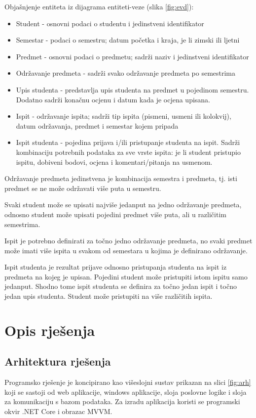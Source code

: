 \documentclass[times, utf8, diplomski]{fer}
\begin{document}
Objašnjenje entiteta iz dijagrama entiteti-veze (slika \ref{fig:evd}):
\begin{itemize}
    \item Student - osnovni podaci o studentu i jedinstveni identifikator
    \item Semestar - podaci o semestru; datum početka i kraja, je li zimski ili ljetni 
    \item Predmet - osnovni podaci o predmetu; sadrži naziv i jedinstveni identifikator
    \item Održavanje predmeta - sadrži svako održavanje predmeta po semestrima
    \item Upis studenta - predstavlja upis studenta na predmet u pojedinom semestru. Dodatno sadrži konačnu ocjenu i datum kada je ocjena upisana.
    \item Ispit - održavanje ispita; sadrži tip ispita (pismeni, usmeni ili kolokvij), datum održavanja, predmet i semestar kojem pripada
    \item Ispit studenta - pojedina prijava i/ili pristupanje studenta na ispit. Sadrži kombinaciju potrebnih podataka za sve vrste ispita: je li student pristupio ispitu, dobiveni bodovi, ocjena i komentari/pitanja na usmenom. 
\end{itemize}{}

Održavanje predmeta jedinstvena je kombinacija semestra i predmeta, tj. isti predmet se ne može održavati više puta u semestru. 

Svaki student može se upisati najviše jedanput na jedno održavanje predmeta, odnosno student može upisati pojedini predmet više puta, ali u različitim semestrima.

Ispit je potrebno definirati za točno jedno održavanje predmeta, no svaki predmet može imati više ispita u svakom od semestara u kojima je definirano održavanje.

Ispit studenta je rezultat prijave odnosno pristupanja studenta na ispit iz predmeta na kojeg je upisan. Pojedini student može pristupiti istom ispitu samo jedanput. Shodno tome ispit studenta se definira za točno jedan ispit i točno jedan upis studenta. Student može pristupiti na više različitih ispita.


\chapter{Opis rješenja}
\section{Arhitektura rješenja}
Programsko rješenje je koncipirano kao višeslojni sustav prikazan na slici \ref{fig:arh} koji se sastoji od web aplikacije, windows aplikacije, sloja poslovne logike i sloja za komunikaciju s bazom podataka. Za izradu aplikacija koristi se programski okvir .NET Core i obrazac MVVM.
\end{document}
